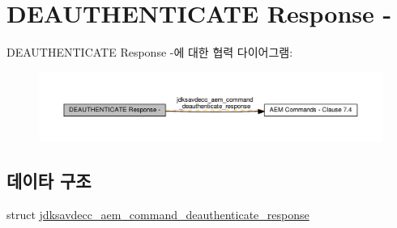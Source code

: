 \hypertarget{group__command__deauthenticate__response}{}\section{D\+E\+A\+U\+T\+H\+E\+N\+T\+I\+C\+A\+TE Response -\/}
\label{group__command__deauthenticate__response}
D\+E\+A\+U\+T\+H\+E\+N\+T\+I\+C\+A\+TE Response -\/에 대한 협력 다이어그램\+:
\nopagebreak
\begin{figure}[H]
\begin{center}
\leavevmode
\includegraphics[width=350pt]{group__command__deauthenticate__response}
\end{center}
\end{figure}
\subsection*{데이타 구조}
\begin{DoxyCompactItemize}
\item 
struct \hyperlink{structjdksavdecc__aem__command__deauthenticate__response}{jdksavdecc\+\_\+aem\+\_\+command\+\_\+deauthenticate\+\_\+response}
\end{DoxyCompactItemize}
